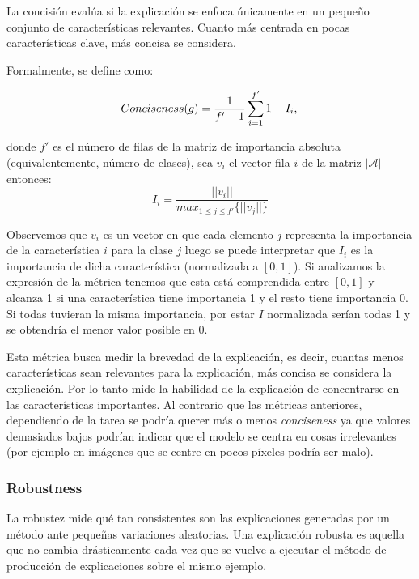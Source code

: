 La concisión evalúa si la explicación se enfoca únicamente en un pequeño conjunto de características relevantes. Cuanto más centrada en pocas características clave, más concisa se considera.

Formalmente, se define como:


\begin{equation}
Conciseness(g) =  \frac{1}{f'-1} \sum_{i=1}^{f'} 1-I_i, \\
\end{equation} 



donde $f'$ es el número de filas de la matriz de importancia absoluta (equivalentemente, número de clases), sea $v_i$ el vector fila $i$ de la matriz $|\mathcal{A}|$ entonces:
\begin{equation}
I_i = \frac{||v_i||}{max_{1\leq  j \leq f'}\{||v_j||\}}
\end{equation}

Observemos que $v_i$ es un vector en que cada elemento $j$ representa la importancia de la característica $i$ para la clase $j$ luego se puede interpretar que $I_i$ es la importancia de dicha característica (normalizada a $[0,1]$). Si analizamos la expresión de la métrica tenemos que esta está comprendida entre $[0,1]$ y alcanza 1 si una característica tiene importancia 1 y el resto tiene importancia 0. Si todas tuvieran la misma importancia, por estar $I$ normalizada serían todas 1 y se obtendría el menor valor posible en 0.

Esta métrica busca medir la brevedad de la explicación, es decir, cuantas menos características sean relevantes para la explicación, más concisa se considera la explicación. Por lo tanto mide la habilidad de la explicación de concentrarse en las características importantes. Al contrario que las métricas anteriores, dependiendo de la tarea se podría querer más o menos \textit{conciseness} ya que valores demasiados bajos podrían indicar que el modelo se centra en cosas irrelevantes (por ejemplo en imágenes que se centre en pocos píxeles podría ser malo).

\subsubsection{Robustness}

La robustez mide qué tan consistentes son las explicaciones generadas por un método ante pequeñas variaciones aleatorias. Una explicación robusta es aquella que no cambia drásticamente cada vez que se vuelve a ejecutar el método de producción de explicaciones sobre el mismo ejemplo.

